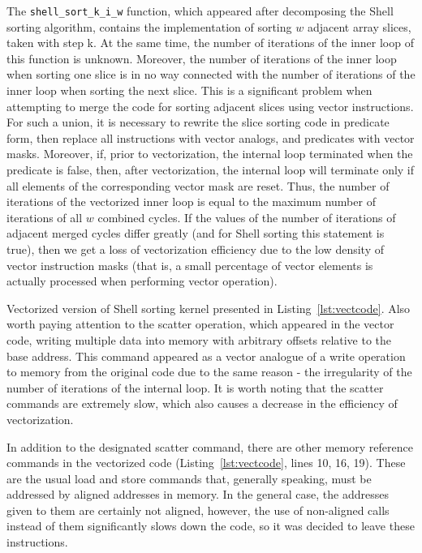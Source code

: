 \documentclass[
11pt,%
tightenlines,%
twoside,%
onecolumn,%
nofloats,%
nobibnotes,%
nofootinbib,%
superscriptaddress,%
noshowpacs,%
centertags]%
{revtex4}
\begin{document}
The \texttt{shell\_sort\_k\_i\_w} function, which appeared after decomposing the Shell sorting algorithm, contains the implementation of sorting $ w $ adjacent array slices, taken with step k. 
At the same time, the number of iterations of the inner loop of this function is unknown.
Moreover, the number of iterations of the inner loop when sorting one slice is in no way connected with the number of iterations of the inner loop when sorting the next slice.
This is a significant problem when attempting to merge the code for sorting adjacent slices using vector instructions.
For such a union, it is necessary to rewrite the slice sorting code in predicate form, then replace all instructions with vector analogs, and predicates with vector masks.
Moreover, if, prior to vectorization, the internal loop terminated when the predicate is false, then, after vectorization, the internal loop will terminate only if all elements of the corresponding vector mask are reset.
Thus, the number of iterations of the vectorized inner loop is equal to the maximum number of iterations of all $ w $ combined cycles.
If the values of the number of iterations of adjacent merged cycles differ greatly (and for Shell sorting this statement is true), then we get a loss of vectorization efficiency due to the low density of vector instruction masks (that is, a small percentage of vector elements is actually processed when performing vector operation).

Vectorized version of Shell sorting kernel presented in Listing~\ref{lst:vectcode}.
Also worth paying attention to the scatter operation, which appeared in the vector code, writing multiple data into memory with arbitrary offsets relative to the base address.
This command appeared as a vector analogue of a write operation to memory from the original code due to the same reason - the irregularity of the number of iterations of the internal loop.
It is worth noting that the scatter commands are extremely slow, which also causes a decrease in the efficiency of vectorization.

In addition to the designated scatter command, there are other memory reference commands in the vectorized code (Listing~\ref{lst:vectcode}, lines 10, 16, 19).
These are the usual load and store commands that, generally speaking, must be addressed by aligned addresses in memory.
In the general case, the addresses given to them are certainly not aligned, however, the use of non-aligned calls instead of them significantly slows down the code, so it was decided to leave these instructions.
\end{document}
